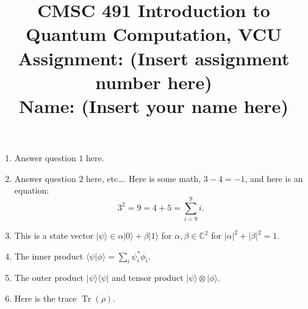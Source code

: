 \documentclass{article}
\newcommand{\abs}[1]{\left\lvert #1 \right\rvert}
\newcommand{\complex}{{\mathbb C}}
\newcommand{\bra}[1]{\langle #1|}
\newcommand{\ket}[1]{|#1\rangle}
\newcommand{\braket}[2]{\langle #1|#2\rangle}
\newcommand{\ketbra}[2]{\ket{#1}{\bra{#2}}}
\newcommand{\trace}{\operatorname{Tr}} %
\begin{document}
\title{
  CMSC 491 Introduction to Quantum Computation, VCU\\
  Assignment: (Insert assignment number here)\\
  Name: (Insert your name here)}

\date{}

\maketitle
\vspace{-10mm}

\begin{enumerate}
  \item Answer question $1$ here.
  \item Answer question $2$ here, etc\ldots. Here is some math, $3-4=-1$, and here is an equation:
        \begin{equation}
          3^2=9=4+5=\sum_{i=9}^9 i.
        \end{equation}
  \item This is a state vector $\ket{\psi}\in\alpha\ket{0}+\beta\ket{1}$ for $\alpha,\beta\in\complex^2$ for $\abs{\alpha}^2+\abs{\beta}^2=1$.
  \item The inner product $\braket{\psi}{\phi}=\sum_{i}\psi_i^*\phi_i$.
  \item The outer product $\ketbra{\psi}{\psi}$ and tensor product $\ket{\psi}\otimes \ket{\phi}$.
  \item Here is the trace $\trace(\rho)$.
\end{enumerate}
\end{document}
